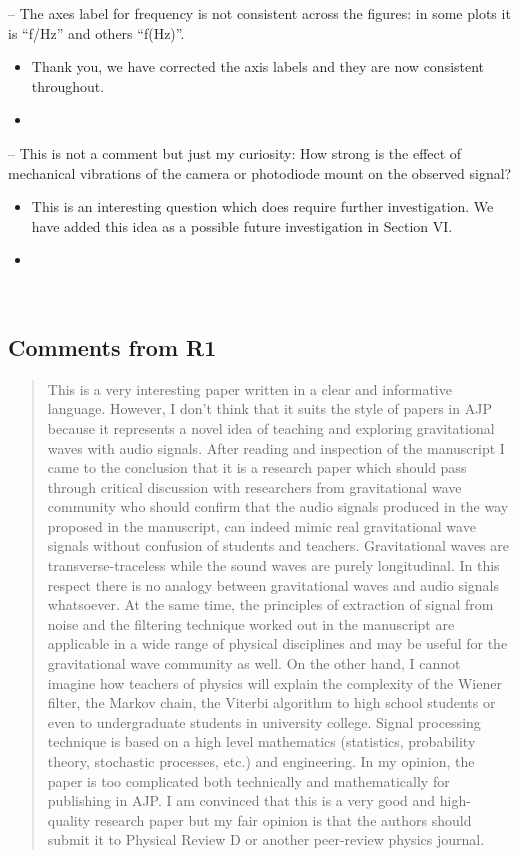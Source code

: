 \documentclass{article}
\begin{document}
\noindent
-- The axes label for frequency is not consistent across the figures: in some plots it is ``f/Hz'' and others ``f(Hz)''.
\begin{itemize}
\item Thank you, we have corrected the axis labels and they are now consistent throughout.
\item[]
\end{itemize}

\noindent
-- This is not a comment but just my curiosity: How strong is the effect of mechanical vibrations of the camera or photodiode mount on the observed signal?
\begin{itemize}
\item This is an interesting question which does require further investigation. We have added this idea as a possible future investigation in Section VI. 
\item[]
\end{itemize}


\hspace{1em}\vspace{1em}\\

\subsection*{Comments from R1}

\begin{quote}
This is a very interesting paper written in a clear and informative language. However, I don’t think that it suits the style of papers in AJP because it represents a novel idea of teaching and exploring gravitational waves with audio signals. After reading and inspection of the manuscript I came to the  conclusion  that it is a  research  paper  which should pass  through critical discussion  with researchers  from gravitational  wave  community who  should  confirm  that  the audio signals produced in the way proposed in the manuscript, can indeed mimic real gravitational wave signals without confusion of students and teachers. Gravitational waves are transverse-traceless while the sound waves are purely longitudinal. In this respect there is no analogy between gravitational waves and audio signals whatsoever. At the same time, the principles of extraction of signal from noise and the filtering technique worked out in the manuscript are applicable in a wide range of physical disciplines and may be useful for the gravitational wave community as well. On the other hand, I cannot imagine how teachers of physics will explain the complexity of the Wiener filter, the Markov chain, the Viterbi algorithm to high school students or even to undergraduate students in university college. Signal processing technique is based  on a  high  level  mathematics (statistics, probability theory, stochastic processes, etc.) and engineering. In my opinion, the paper is too complicated both technically and mathematically for publishing in AJP. I am convinced that this is a very good and high-quality research  paper but  my  fair  opinion  is  that the authors should submit  it  to  Physical Review D or another peer-review physics journal. 
\end{quote}
\end{document}
